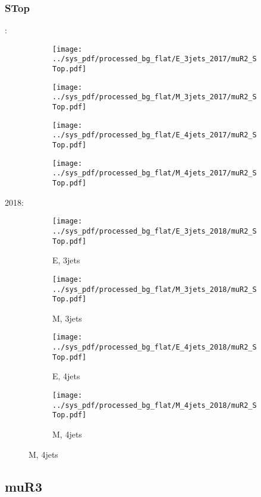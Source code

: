 \documentclass{beamer}
\begin{document}
\begin{frame}
\frametitle{STop}
\fontsize{5}{1}:
\begin{figure}
\centering
\begin{subfigure}[b]{0.24\textwidth}
\texttt{[image: ../sys\_pdf/processed\_bg\_flat/E\_3jets\_2017/muR2\_STop.pdf]}
\end{subfigure}
\begin{subfigure}[b]{0.24\textwidth}
\texttt{[image: ../sys\_pdf/processed\_bg\_flat/M\_3jets\_2017/muR2\_STop.pdf]}
\end{subfigure}
\begin{subfigure}[b]{0.24\textwidth}
\texttt{[image: ../sys\_pdf/processed\_bg\_flat/E\_4jets\_2017/muR2\_STop.pdf]}
\end{subfigure}
\begin{subfigure}[b]{0.24\textwidth}
\texttt{[image: ../sys\_pdf/processed\_bg\_flat/M\_4jets\_2017/muR2\_STop.pdf]}
\end{subfigure}
\end{figure}
2018:
\begin{figure}
\centering
\begin{subfigure}[b]{0.24\textwidth}
\texttt{[image: ../sys\_pdf/processed\_bg\_flat/E\_3jets\_2018/muR2\_STop.pdf]}
\captionsetup{font=tiny}
\caption{E, 3jets}
\end{subfigure}
\begin{subfigure}[b]{0.24\textwidth}
\texttt{[image: ../sys\_pdf/processed\_bg\_flat/M\_3jets\_2018/muR2\_STop.pdf]}
\captionsetup{font=tiny}
\caption{M, 3jets}
\end{subfigure}
\begin{subfigure}[b]{0.24\textwidth}
\texttt{[image: ../sys\_pdf/processed\_bg\_flat/E\_4jets\_2018/muR2\_STop.pdf]}
\captionsetup{font=tiny}
\caption{E, 4jets}
\end{subfigure}
\begin{subfigure}[b]{0.24\textwidth}
\texttt{[image: ../sys\_pdf/processed\_bg\_flat/M\_4jets\_2018/muR2\_STop.pdf]}
\captionsetup{font=tiny}
\caption{M, 4jets}
\end{subfigure}
\end{figure}
\end{frame}


\subsection{muR3}
\end{document}

